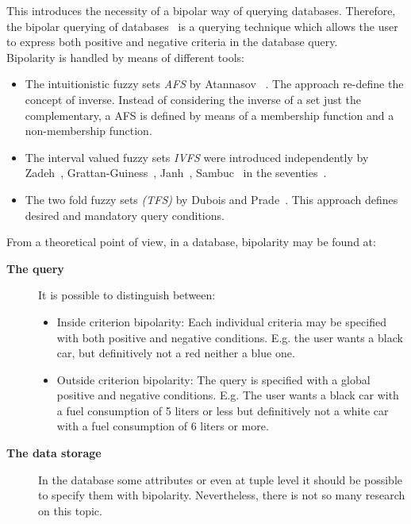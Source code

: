 This introduces the necessity of a bipolar way of querying databases. Therefore, the bipolar querying of databases~\cite{DeTre2009} is a querying technique which allows the user to express both positive and negative criteria in the database query.\\

Bipolarity is handled by means of different tools:

\begin{itemize}
\item
The intuitionistic fuzzy sets  \emph{AFS} by Atannasov ~\cite{Atanassov1986}. The approach re-define the concept of inverse. Instead of considering the inverse of a set just the complementary, a AFS is defined by means of a membership function and a non-membership function.
\item
The interval valued fuzzy sets \emph{IVFS} were introduced independently by Zadeh~\cite{Zadeh75a}, Grattan-Guiness~\cite{Grattan76}, Janh~\cite{Jahn75}, Sambuc~\cite{Sambuc75} in the seventies~\cite{Dubois05}. %
\item
The two fold fuzzy sets \emph{(TFS)} by Dubois and Prade~\cite{Dubois02}. This approach defines desired and mandatory query conditions.
\end{itemize}

From a theoretical point of view, in a database, bipolarity may be found at:
\begin{description}
\item[\textbf{The query}] It is possible to distinguish between:
	\begin{itemize}
	\item
	Inside criterion bipolarity: Each individual criteria may be specified with both positive and negative conditions. E.g. the user wants a black car, but definitively not a red neither a blue one.
	\item
	Outside criterion bipolarity: The query is specified with a global positive and negative conditions. E.g. The user wants a black car with a fuel consumption of 5 liters or less but definitively not a white car with a fuel consumption of 6 liters or more. 
	\end{itemize}
\item[\textbf{The data storage}] In the database some attributes or even at tuple level it should be possible to specify them with bipolarity. Nevertheless, there is not so many research on this topic.
\end{description}

